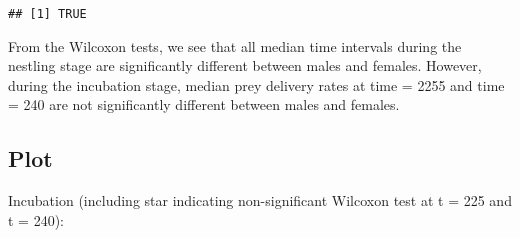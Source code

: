 \documentclass[
]{article}
\newenvironment{Shaded}{\begin{snugshade}}{\end{snugshade}}
\newcommand{\CommentTok}[1]{\textcolor[rgb]{0.56,0.35,0.01}{\textit{#1}}}
\newcommand{\FloatTok}[1]{\textcolor[rgb]{0.00,0.00,0.81}{#1}}
\newcommand{\FunctionTok}[1]{\textcolor[rgb]{0.00,0.00,0.00}{#1}}
\newcommand{\NormalTok}[1]{#1}
\newcommand{\SpecialCharTok}[1]{\textcolor[rgb]{0.00,0.00,0.00}{#1}}
\begin{document}
\begin{Shaded}
\end{Shaded}

\begin{verbatim}
## [1] TRUE
\end{verbatim}

From the Wilcoxon tests, we see that all median time intervals during
the nestling stage are significantly different between males and
females. However, during the incubation stage, median prey delivery
rates at time = 2255 and time = 240 are not significantly different
between males and females.

\hypertarget{plot}{%
\subsection{Plot}\label{plot}}

Incubation (including star indicating non-significant Wilcoxon test at t
= 225 and t = 240):
\end{document}
